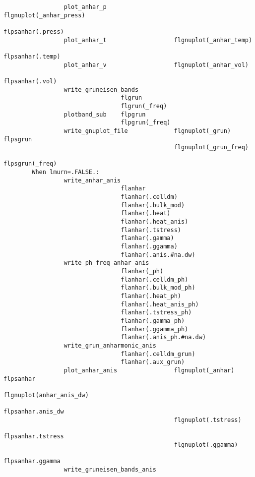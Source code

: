 \documentclass[12pt,a4paper,twoside]{report}
\begin{document}
\begin{footnotesize}
\begin{verbatim}
                 plot_anhar_p                   flgnuplot(_anhar_press)
                                                            flpsanhar(.press)
                 plot_anhar_t                   flgnuplot(_anhar_temp)
                                                            flpsanhar(.temp)
                 plot_anhar_v                   flgnuplot(_anhar_vol)
                                                            flpsanhar(.vol)
                 write_gruneisen_bands
                                 flgrun
                                 flgrun(_freq)
                 plotband_sub    flpgrun
                                 flpgrun(_freq)
                 write_gnuplot_file             flgnuplot(_grun)    flpsgrun
                                                flgnuplot(_grun_freq) 
                                                                 flpsgrun(_freq)
        When lmurn=.FALSE.:
                 write_anhar_anis
                                 flanhar
                                 flanhar(.celldm)
                                 flanhar(.bulk_mod)
                                 flanhar(.heat)
                                 flanhar(.heat_anis)
                                 flanhar(.tstress)
                                 flanhar(.gamma)
                                 flanhar(.ggamma)
                                 flanhar(.anis.#na.dw)
                 write_ph_freq_anhar_anis
                                 flanhar(_ph)
                                 flanhar(.celldm_ph)
                                 flanhar(.bulk_mod_ph)
                                 flanhar(.heat_ph)
                                 flanhar(.heat_anis_ph)
                                 flanhar(.tstress_ph)
                                 flanhar(.gamma_ph)
                                 flanhar(.ggamma_ph)
                                 flanhar(.anis_ph.#na.dw)
                 write_grun_anharmonic_anis
                                 flanhar(.celldm_grun)
                                 flanhar(.aux_grun)
                 plot_anhar_anis                flgnuplot(_anhar)   flpsanhar
                                                flgnuplot(anhar_anis_dw) 
                                                            flpsanhar.anis_dw
                                                flgnuplot(.tstress)  
                                                            flpsanhar.tstress
                                                flgnuplot(.ggamma)  
                                                            flpsanhar.ggamma
                 write_gruneisen_bands_anis

\end{verbatim}
\end{footnotesize}
\end{document}
